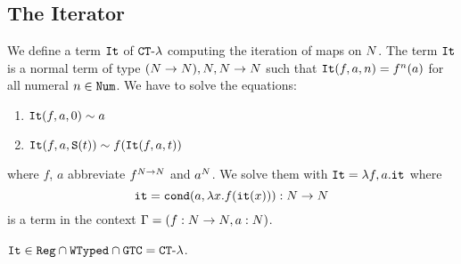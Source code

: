 
\subsection{The Iterator}

\begin{Eg}
We define a term ${\tt It}$ of  ${ {\tt CT}\mbox{-}\lambda}$ computing the iteration of maps on ${N}$.
The term ${\tt It}$ is a normal term of type $({N} \rightarrow {N}), {N},{N} \rightarrow {N}$ such that
${\tt It}(f,a,n)=f^n(a)$ for all numeral $n \in {\tt Num}$. 
We have to solve the equations:

\begin{enumerate}
\item
${\tt It}(f,a,0) \sim a$ 
\item
${\tt It}(f,a,{\tt S} (t)) \sim f({\tt It}(f,a,t))$
\end{enumerate}

where $f$, $a$ abbreviate $f^{{N}\rightarrow{N}}$ and $a^{N}$.
We solve them with ${\tt It} = \lambda f, a.{\tt it}$
where 
$$
{\tt it} = {\tt cond} (a, \lambda x.f({\tt it}(x))):{N} \rightarrow {N}
$$ 
is a term in the context $\Gamma = (f:{N} \rightarrow {N}, a:{N})$.
\end{Eg}

\begin{proposition}
${\tt It} \in {\tt Reg} \cap {\tt WTyped} \cap {\tt GTC} = { {\tt CT}\mbox{-}\lambda}$.
\end{proposition}


